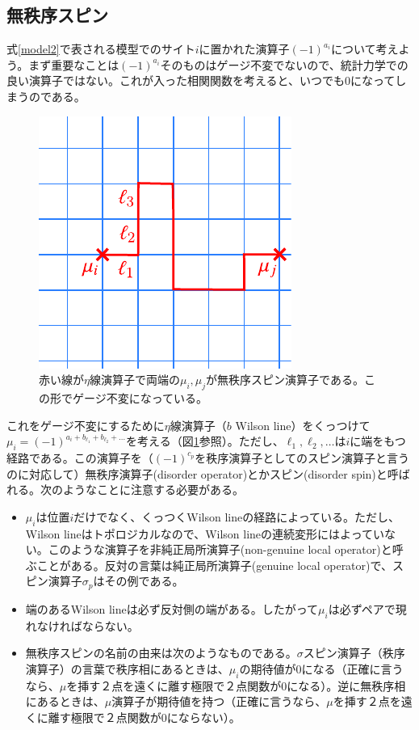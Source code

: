 \documentclass[a4paper,12pt,dvipdfmx]{jlreq}
\begin{document}
\subsection{無秩序スピン}
式\eqref{model2}で表される模型でのサイト$i$に置かれた演算子$(-1)^{a_i}$について考えよう。まず重要なことは$(-1)^{a_i}$そのものはゲージ不変でないので、統計力学での良い演算子ではない。これが入った相関関数を考えると、いつでも$0$になってしまうのである。

\begin{figure}
  \centering
  \includegraphics{disorder.pdf}
  \caption{赤い線が$\eta$線演算子で両端の$\mu_i,\mu_j$が無秩序スピン演算子である。この形でゲージ不変になっている。}
  \label{fig:disorder}
\end{figure}

これをゲージ不変にするために$\eta$線演算子（$b$ Wilson line）をくっつけて
$\mu_i=(-1)^{a_i+b_{\ell_1}+b_{\ell_2}+\dots}$を考える（図\ref{fig:disorder}参照）。ただし、$\ell_1,\ell_2,\dots$は$i$に端をもつ経路である。この演算子を（$(-1)^{c_p}$を秩序演算子としてのスピン演算子と言うのに対応して）無秩序演算子(disorder operator)とかスピン(disorder spin)と呼ばれる。次のようなことに注意する必要がある。
\begin{itemize}
  \item $\mu_i$は位置$i$だけでなく、くっつくWilson lineの経路によっている。ただし、Wilson lineはトポロジカルなので、Wilson lineの連続変形にはよっていない。このような演算子を非純正局所演算子(non-genuine local operator)と呼ぶことがある。反対の言葉は純正局所演算子(genuine local operator)で、スピン演算子$\sigma_{p}$はその例である。
  \item 端のあるWilson lineは必ず反対側の端がある。したがって$\mu_i$は必ずペアで現れなければならない。
  \item 無秩序スピンの名前の由来は次のようなものである。$\sigma$スピン演算子（秩序演算子）の言葉で秩序相にあるときは、$\mu_i$の期待値が$0$になる（正確に言うなら、$\mu$を挿す２点を遠くに離す極限で２点関数が$0$になる）。逆に無秩序相にあるときは、$\mu$演算子が期待値を持つ（正確に言うなら、$\mu$を挿す２点を遠くに離す極限で２点関数が$0$にならない）。
\end{itemize}
\end{document}
